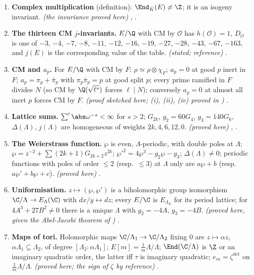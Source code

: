 \begin{enumerate}[label=\textbf{\thechapter.\arabic*}]
.
\item \textbf{Complex multiplication} (definition): $\End_{\bar K}(E)\ne\Z$; it is an isogeny invariant. \emph{(the invariance proved here)} , .
\item \textbf{The thirteen CM $j$-invariants.} $E/\Q$ with CM by $\mathcal O$ has $h(\mathcal O)=1$, $D_{\mathcal O}$ is one of $-3$, $-4$, $-7$, $-8$, $-11$, $-12$, $-16$, $-19$, $-27$, $-28$, $-43$, $-67$, $-163$, and $j(E)$ is the corresponding value of the table.
\emph{(stated; reference)} .
\item \textbf{CM and $a_p$.} For $E/\Q$ with CM by $F$: $\rho\simeq\rho\otimes\chi_F$; $a_p=0$ at good $p$ inert in $F$; $a_p=\pi_p+\bar\pi_p$ with $\pi_p\bar\pi_p=p$ at good split $p$; every prime ramified in $F$
divides $N$ (so CM by $\Q(\sqrt{\ell^*})$ forces $\ell\mid N$); conversely $a_p=0$ at almost all inert $p$ forces CM by $F$. \emph{(proof sketched here; (i), (ii), (iv) proved in )}
.
\item \textbf{Lattice sums.} $\sum'\abs\omega^{-s}<\infty$ for $s>2$; $G_{2k}$, $g_2=60G_4$, $g_3=140G_6$, $\Delta(\Lambda)$, $j(\Lambda)$ are homogeneous of weights $2k,4,6,12,0$. \emph{(proved here)}
, .
\item \textbf{The Weierstrass function.} $\wp$ is even, $\Lambda$-periodic, with double poles at $\Lambda$; $\wp=z^{-2}+\sum(2k+1)G_{2k+2}z^{2k}$; $\wp'^2=4\wp^3-g_2\wp-g_3$; $\Delta(\Lambda)\ne0$; periodic functions with poles of
order $\le2$ (resp.\ $\le3$) at $\Lambda$ only are $a\wp+b$ (resp.\ $a\wp'+b\wp+c$). \emph{(proved here)} .
\item \textbf{Uniformisation.} $z\mapsto(\wp,\wp')$ is a biholomorphic group isomorphism $\C/\Lambda\to E_\Lambda(\C)$ with $dx/y\leftrightarrow dz$; every $E/\C$ is $E_{\Lambda_E}$ for its period lattice; for $4A^3+27B^2\ne0$ there is a
unique $\Lambda$ with $g_2=-4A$, $g_3=-4B$. \emph{(proved here, given the Abel-Jacobi theorem of )} .
\item \textbf{Maps of tori.} Holomorphic maps $\C/\Lambda_1\to\C/\Lambda_2$ fixing $0$ are $z\mapsto\alpha z$, $\alpha\Lambda_1\subseteq\Lambda_2$, of degree $[\Lambda_2:\alpha\Lambda_1]$; $E[m]=\frac1m\Lambda/\Lambda$; $\End(\C/\Lambda)$ is $\Z$ or an
imaginary quadratic order, the latter iff $\tau$ is imaginary quadratic; $e_m=\zeta^{\det}$ on $\frac1m\Lambda/\Lambda$. \emph{(proved here; the sign of $\zeta$ by reference)} .

\end{enumerate}
